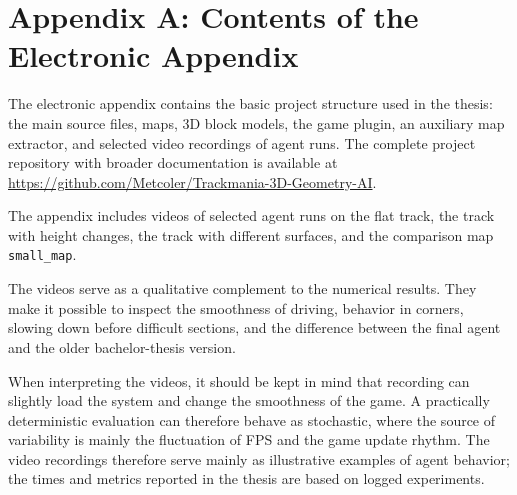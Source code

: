 \chapter*{Appendix A: Contents of the Electronic Appendix}

The electronic appendix contains the basic project structure used in the thesis: the main source files, maps, 3D block models, the game plugin, an auxiliary map extractor, and selected video recordings of agent runs. The complete project repository with broader documentation is available at \url{https://github.com/Metcoler/Trackmania-3D-Geometry-AI}.

The appendix includes videos of selected agent runs on the flat track, the track with height changes, the track with different surfaces, and the comparison map \texttt{small\_map}.

The videos serve as a qualitative complement to the numerical results. They make it possible to inspect the smoothness of driving, behavior in corners, slowing down before difficult sections, and the difference between the final agent and the older bachelor-thesis version.

When interpreting the videos, it should be kept in mind that recording can slightly load the system and change the smoothness of the game. A practically deterministic evaluation can therefore behave as stochastic, where the source of variability is mainly the fluctuation of FPS and the game update rhythm. The video recordings therefore serve mainly as illustrative examples of agent behavior; the times and metrics reported in the thesis are based on logged experiments.
